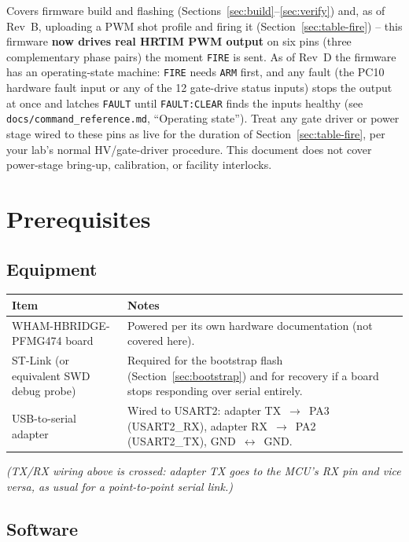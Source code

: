 \documentclass[11pt]{article}
\newcommand{\code}[1]{\texttt{#1}}
\begin{document}
Covers firmware build and flashing (Sections~\ref{sec:build}--\ref{sec:verify})
and, as of Rev~B, uploading a PWM shot profile and firing it
(Section~\ref{sec:table-fire}) -- this firmware \textbf{now drives real
HRTIM PWM output} on six pins (three complementary phase pairs) the
moment \code{FIRE} is sent. As of Rev~D the firmware has an operating-state
machine: \code{FIRE} needs \code{ARM} first, and any fault (the PC10
hardware fault input or any of the 12 gate-drive status inputs) stops the
output at once and latches \code{FAULT} until \code{FAULT:CLEAR} finds the
inputs healthy (see \code{docs/command\_reference.md}, ``Operating
state''). Treat any gate driver or power stage wired to these pins as live
for the duration of Section~\ref{sec:table-fire}, per your lab's normal
HV/gate-driver procedure. This document does not cover power-stage
bring-up, calibration, or facility interlocks.

\section{Prerequisites}

\subsection{Equipment}

\begin{center}
\begin{tabular}{p{1.5in} p{3.2in}}
  \hline
  \textbf{Item} & \textbf{Notes} \\
  \hline
  WHAM-HBRIDGE-PFMG474 board & Powered per its own hardware documentation
    (not covered here). \\
  ST-Link (or equivalent SWD debug probe) & Required for the bootstrap
    flash (Section~\ref{sec:bootstrap}) and for recovery if a board
    stops responding over serial entirely. \\
  USB-to-serial adapter & Wired to USART2: adapter TX~$\to$~PA3
    (USART2\_RX), adapter RX~$\to$~PA2 (USART2\_TX), GND~$\leftrightarrow$~GND. \\
  \hline
\end{tabular}
\end{center}

\noindent\textit{(TX\slash RX wiring above is crossed: adapter TX goes
to the MCU's RX pin and vice versa, as usual for a point-to-point serial
link.)}

\subsection{Software}
\end{document}
